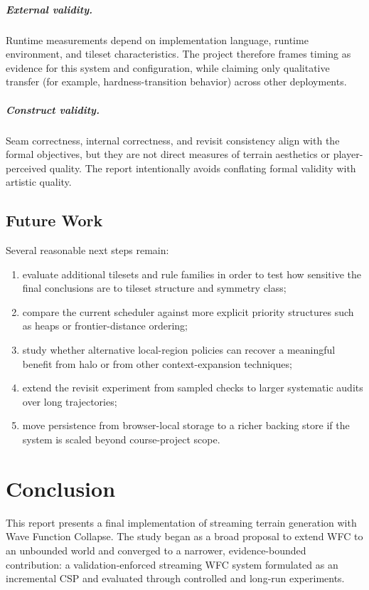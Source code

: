 \documentclass[12pt,a4paper]{report}
\begin{document}
\paragraph{External validity.} Runtime measurements depend on implementation language, runtime environment, and tileset characteristics. The project therefore frames timing as evidence for this system and configuration, while claiming only qualitative transfer (for example, hardness-transition behavior) across other deployments.

\paragraph{Construct validity.} Seam correctness, internal correctness, and revisit consistency align with the formal objectives, but they are not direct measures of terrain aesthetics or player-perceived quality. The report intentionally avoids conflating formal validity with artistic quality.

\section{Future Work}
Several reasonable next steps remain:
\begin{enumerate}
\item evaluate additional tilesets and rule families in order to test how sensitive the final conclusions are to tileset structure and symmetry class;
\item compare the current scheduler against more explicit priority structures such as heaps or frontier-distance ordering;
\item study whether alternative local-region policies can recover a meaningful benefit from halo or from other context-expansion techniques;
\item extend the revisit experiment from sampled checks to larger systematic audits over long trajectories;
\item move persistence from browser-local storage to a richer backing store if the system is scaled beyond course-project scope.
\end{enumerate}

\chapter{Conclusion}
This report presents a final implementation of streaming terrain generation with Wave Function Collapse. The study began as a broad proposal to extend WFC to an unbounded world and converged to a narrower, evidence-bounded contribution: a validation-enforced streaming WFC system formulated as an incremental CSP and evaluated through controlled and long-run experiments.
\end{document}
